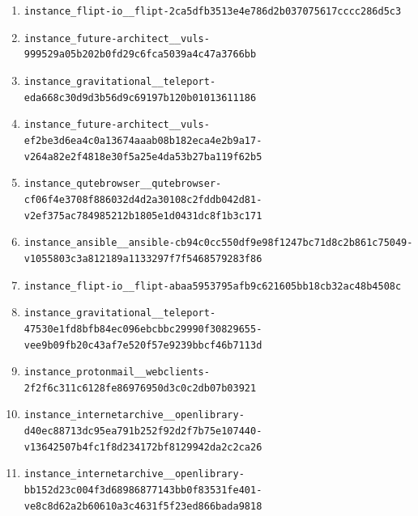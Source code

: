 \begin{enumerate}
\item \texttt{instance\_\allowbreak{}flipt-\allowbreak{}io\_\allowbreak{}\_\allowbreak{}flipt-\allowbreak{}2ca5dfb3513e4e\allowbreak{}786d2b03707561\allowbreak{}7cccc286d5c3}
\item \texttt{instance\_\allowbreak{}future-\allowbreak{}architect\_\allowbreak{}\_\allowbreak{}vuls-\allowbreak{}999529a05b202b\allowbreak{}0fd29c6fca5039\allowbreak{}a4c47a3766bb}
\item \texttt{instance\_\allowbreak{}gravitational\_\allowbreak{}\_\allowbreak{}teleport-\allowbreak{}eda668c30d9d3b\allowbreak{}56d9c69197b120\allowbreak{}b01013611186}
\item \texttt{instance\_\allowbreak{}future-\allowbreak{}architect\_\allowbreak{}\_\allowbreak{}vuls-\allowbreak{}ef2be3d6ea4c0a\allowbreak{}13674aaab08b18\allowbreak{}2eca4e2b9a17-\allowbreak{}v264a82e2f4818\allowbreak{}e30f5a25e4da53\allowbreak{}b27ba119f62b5}
\item \texttt{instance\_\allowbreak{}qutebrowser\_\allowbreak{}\_\allowbreak{}qutebrowser-\allowbreak{}cf06f4e3708f88\allowbreak{}6032d4d2a30108\allowbreak{}c2fddb042d81-\allowbreak{}v2ef375ac78498\allowbreak{}5212b1805e1d04\allowbreak{}31dc8f1b3c171}
\item \texttt{instance\_\allowbreak{}ansible\_\allowbreak{}\_\allowbreak{}ansible-\allowbreak{}cb94c0cc550df9\allowbreak{}e98f1247bc71d8\allowbreak{}c2b861c75049-\allowbreak{}v1055803c3a812\allowbreak{}189a1133297f7f\allowbreak{}5468579283f86}
\item \texttt{instance\_\allowbreak{}flipt-\allowbreak{}io\_\allowbreak{}\_\allowbreak{}flipt-\allowbreak{}abaa5953795afb\allowbreak{}9c621605bb18cb\allowbreak{}32ac48b4508c}
\item \texttt{instance\_\allowbreak{}gravitational\_\allowbreak{}\_\allowbreak{}teleport-\allowbreak{}47530e1fd8bfb8\allowbreak{}4ec096ebcbbc29\allowbreak{}990f30829655-\allowbreak{}vee9b09fb20c43\allowbreak{}af7e520f57e923\allowbreak{}9bbcf46b7113d}
\item \texttt{instance\_\allowbreak{}protonmail\_\allowbreak{}\_\allowbreak{}webclients-\allowbreak{}2f2f6c311c6128\allowbreak{}fe86976950d3c0\allowbreak{}c2db07b03921}
\item \texttt{instance\_\allowbreak{}internetarchiv\allowbreak{}e\_\allowbreak{}\_\allowbreak{}openlibrary-\allowbreak{}d40ec88713dc95\allowbreak{}ea791b252f92d2\allowbreak{}f7b75e107440-\allowbreak{}v13642507b4fc1\allowbreak{}f8d234172bf812\allowbreak{}9942da2c2ca26}
\item \texttt{instance\_\allowbreak{}internetarchiv\allowbreak{}e\_\allowbreak{}\_\allowbreak{}openlibrary-\allowbreak{}bb152d23c004f3\allowbreak{}d68986877143bb\allowbreak{}0f83531fe401-\allowbreak{}ve8c8d62a2b606\allowbreak{}10a3c4631f5f23\allowbreak{}ed866bada9818}

\end{enumerate}
